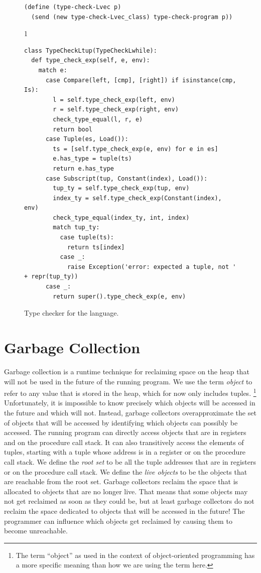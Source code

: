\documentclass[7x10,nocrop]{TimesAPriori_MIT}%
\def\pythonEd{1}
\def\edition{0}
\begin{document}
\begin{figure}[tp]
{\begin{lstlisting}[basicstyle=\ttfamily\scriptsize]
(define (type-check-Lvec p)
  (send (new type-check-Lvec_class) type-check-program p))
\end{lstlisting}
\fi}
{\if\edition\pythonEd
\begin{lstlisting}
class TypeCheckLtup(TypeCheckLwhile):
  def type_check_exp(self, e, env):
    match e:
      case Compare(left, [cmp], [right]) if isinstance(cmp, Is):
        l = self.type_check_exp(left, env)
        r = self.type_check_exp(right, env)
        check_type_equal(l, r, e)
        return bool
      case Tuple(es, Load()):
        ts = [self.type_check_exp(e, env) for e in es]
        e.has_type = tuple(ts)
        return e.has_type
      case Subscript(tup, Constant(index), Load()):
        tup_ty = self.type_check_exp(tup, env)
        index_ty = self.type_check_exp(Constant(index), env)
        check_type_equal(index_ty, int, index)
        match tup_ty:
          case tuple(ts):
            return ts[index]
          case _:
            raise Exception('error: expected a tuple, not ' + repr(tup_ty))
      case _:
        return super().type_check_exp(e, env)
\end{lstlisting}
\fi}
\caption{Type checker for the \LangVec{} language.}
\label{fig:type-check-Lvec}
\end{figure}


\section{Garbage Collection}
\label{sec:GC}

Garbage collection is a runtime technique for reclaiming space on the
heap that will not be used in the future of the running program. We
use the term \emph{object} to refer to any
value that is stored in the heap, which for now only includes
tuples.%
%
\footnote{The term ``object'' as used in the context of
object-oriented programming has a more specific meaning than how we
are using the term here.}
%
Unfortunately, it is impossible to know precisely which objects will
be accessed in the future and which will not.  Instead, garbage
collectors overapproximate the set of objects that will be accessed by
identifying which objects can possibly be accessed.  The running
program can directly access objects that are in registers and on the
procedure call stack. It can also transitively access the elements of
tuples, starting with a tuple whose address is in a register or on the
procedure call stack.  We define the \emph{root
set} to be all the tuple addresses that are
in registers or on the procedure call stack.  We define the \emph{live
objects} to be the objects that are
reachable from the root set. Garbage collectors reclaim the space that
is allocated to objects that are no longer live.  That means that some
objects may not get reclaimed as soon as they could be, but at least
garbage collectors do not reclaim the space dedicated to objects that
will be accessed in the future! The programmer can influence which
objects get reclaimed by causing them to become unreachable.
\end{document}
